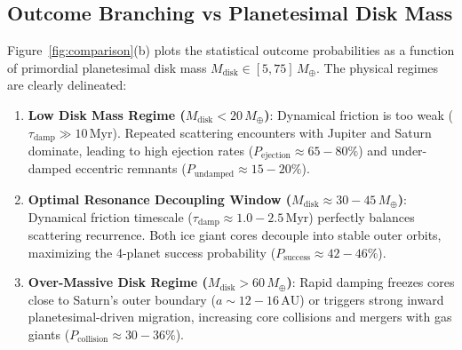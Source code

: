 \documentclass[11pt,a4paper]{article}
\begin{document}
\subsection{Outcome Branching vs Planetesimal Disk Mass}
Figure~\ref{fig:comparison}(b) plots the statistical outcome probabilities as a function of primordial planetesimal disk mass $M_{\text{disk}} \in [5, 75]\,M_\oplus$. The physical regimes are clearly delineated:
\begin{enumerate}
    \item \textbf{Low Disk Mass Regime ($M_{\text{disk}} < 20\,M_\oplus$)}: Dynamical friction is too weak ($\tau_{\text{damp}} \gg 10\,\text{Myr}$). Repeated scattering encounters with Jupiter and Saturn dominate, leading to high ejection rates ($P_{\text{ejection}} \approx 65-80\%$) and under-damped eccentric remnants ($P_{\text{undamped}} \approx 15-20\%$).
    \item \textbf{Optimal Resonance Decoupling Window ($M_{\text{disk}} \approx 30-45\,M_\oplus$)}: Dynamical friction timescale ($\tau_{\text{damp}} \approx 1.0-2.5\,\text{Myr}$) perfectly balances scattering recurrence. Both ice giant cores decouple into stable outer orbits, maximizing the 4-planet success probability ($P_{\text{success}} \approx 42-46\%$).
    \item \textbf{Over-Massive Disk Regime ($M_{\text{disk}} > 60\,M_\oplus$)}: Rapid damping freezes cores close to Saturn's outer boundary ($a \sim 12-16\,\text{AU}$) or triggers strong inward planetesimal-driven migration, increasing core collisions and mergers with gas giants ($P_{\text{collision}} \approx 30-36\%$).
\end{enumerate}
\end{document}
